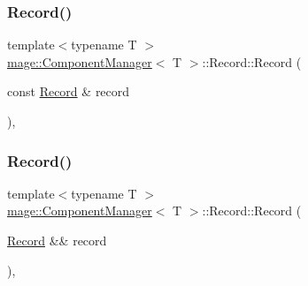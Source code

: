 \mbox{\label{classmage_1_1_component_manager_1_1_record_acc167a0e13b17bf874ee9c8bd4283c8c}} 
\subsubsection{\texorpdfstring{Record()}{Record()}\hspace{0.1cm}{\footnotesize\ttfamily [3/4]}}
{\footnotesize\ttfamily template$<$typename T $>$ \\
\mbox{\hyperlink{classmage_1_1_component_manager}{mage\+::\+Component\+Manager}}$<$ T $>$\+::Record\+::\+Record (\begin{DoxyParamCaption}\item[{const \mbox{\hyperlink{classmage_1_1_component_manager_1_1_record}{Record}} \&}]{record }\end{DoxyParamCaption})\hspace{0.3cm}{\ttfamily [default]}, {\ttfamily [noexcept]}}

\mbox{\label{classmage_1_1_component_manager_1_1_record_a2626e285001ccfb2f209d98b5be3499f}} 
\subsubsection{\texorpdfstring{Record()}{Record()}\hspace{0.1cm}{\footnotesize\ttfamily [4/4]}}
{\footnotesize\ttfamily template$<$typename T $>$ \\
\mbox{\hyperlink{classmage_1_1_component_manager}{mage\+::\+Component\+Manager}}$<$ T $>$\+::Record\+::\+Record (\begin{DoxyParamCaption}\item[{\mbox{\hyperlink{classmage_1_1_component_manager_1_1_record}{Record}} \&\&}]{record }\end{DoxyParamCaption})\hspace{0.3cm}{\ttfamily [default]}, {\ttfamily [noexcept]}}

